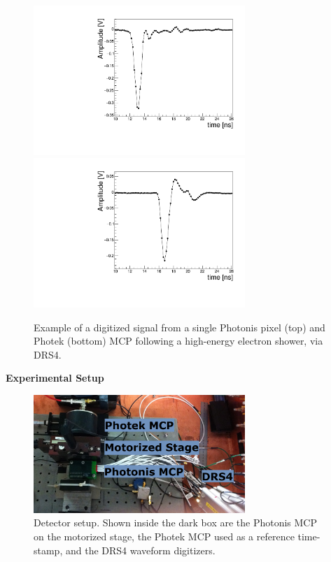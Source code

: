 \documentclass[twocolumn]{article}
\begin{document}
\begin{figure}[htbp]
	\centering
	\includegraphics[width=8cm]{Images/expulse/pulsepix_30_2_12.pdf}
	\includegraphics[width=8cm]{Images/expulse/pulseref_30_2_10.pdf}
	\caption{\small Example of a digitized signal from a single Photonis pixel (top) and Photek (bottom) MCP following a high-energy electron shower, via DRS4.}
	\label{fig:expulse}
\end{figure}



\title{\large}{\textbf{Experimental Setup}}

\begin{figure}[htbp]
	\centering
	\includegraphics[width=8cm]{Images/setup/setup.png}
	\caption{\small Detector setup. Shown inside the dark box are the Photonis MCP on the motorized stage, the Photek MCP used as a reference time-stamp, and the DRS4 waveform digitizers.}
	\label{fig:setup}
\end{figure}
\end{document}
